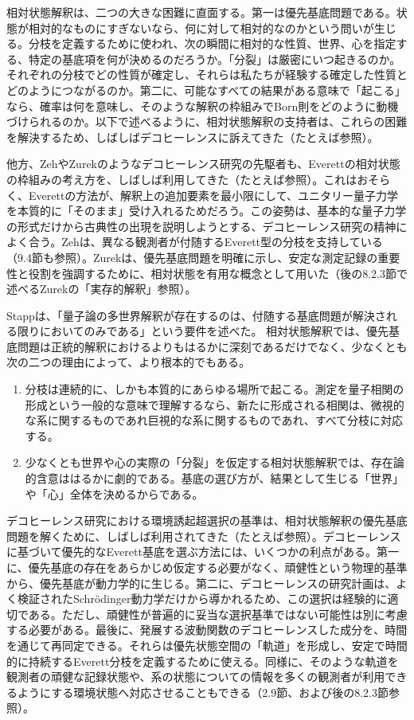 相対状態解釈は、二つの大きな困難に直面する。第一は優先基底問題である。状態が相対的なものにすぎないなら、何に対して相対的なのかという問いが生じる。分枝を定義するために使われ、次の瞬間に相対的な性質、世界、心を指定する、特定の基底項を何が決めるのだろうか。「分裂」は厳密にいつ起きるのか。それぞれの分枝でどの性質が確定し、それらは私たちが経験する確定した性質とどのようにつながるのか。第二に、可能なすべての結果がある意味で「起こる」なら、確率は何を意味し、そのような解釈の枠組みでBorn則をどのように動機づけられるのか。以下で述べるように、相対状態解釈の支持者は、これらの困難を解決するため、しばしばデコヒーレンスに訴えてきた（たとえば\cite{ref398,ref400,ref401,ref402,ref403,ref404,ref405,ref406,ref407}参照）。

他方、ZehやZurekのようなデコヒーレンス研究の先駆者も、Everettの相対状態の枠組みの考え方を、しばしば利用してきた（たとえば\cite{ref004,ref005,ref104,ref408}参照）。これはおそらく、Everettの方法が、解釈上の追加要素を最小限にして、ユニタリー量子力学を本質的に「そのまま」受け入れるためだろう。この姿勢は、基本的な量子力学の形式だけから古典性の出現を説明しようとする、デコヒーレンス研究の精神によく合う。Zehは、異なる観測者が付随するEverett型の分枝を支持している\cite{ref408}（9.4節も参照）。Zurekは、優先基底問題を明確に示し\cite{ref008}、安定な測定記録の重要性と役割を強調する\cite{ref084,ref104}ために、相対状態を有用な概念として用いた（後の8.2.3節で述べるZurekの「実存的解釈」参照）。

Stapp\cite[1043頁]{ref409}は、「量子論の多世界解釈が存在するのは、付随する基底問題が解決される限りにおいてのみである」という要件を述べた。
\hypertarget{srcpage:338}{}\label{srcpage:338}
相対状態解釈では、優先基底問題は正統的解釈におけるよりもはるかに深刻であるだけでなく、少なくとも次の二つの理由によって、より根本的でもある。
\begin{enumerate}
\item 分枝は連続的に、しかも本質的にあらゆる場所で起こる。測定を量子相関の形成という一般的な意味で理解するなら、新たに形成される相関は、微視的な系に関するものであれ巨視的な系に関するものであれ、すべて分枝に対応する。
\item 少なくとも世界や心の実際の「分裂」を仮定する相対状態解釈では、存在論的含意ははるかに劇的である。基底の選び方が、結果として生じる「世界」や「心」全体を決めるからである。
\end{enumerate}
デコヒーレンス研究における環境誘起超選択の基準は、相対状態解釈の優先基底問題を解くために、しばしば利用されてきた（たとえば\cite{ref104,ref406,ref407,ref410}参照）。デコヒーレンスに基づいて優先的なEverett基底を選ぶ方法には、いくつかの利点がある。第一に、優先基底の存在をあらかじめ仮定する必要がなく、頑健性という物理的基準から、優先基底が動力学的に生じる。第二に、デコヒーレンスの研究計画は、よく検証されたSchrödinger動力学だけから導かれるため、この選択は経験的に適切である。ただし、頑健性が普遍的に妥当な選択基準ではない可能性は別に考慮する必要がある。最後に、発展する波動関数のデコヒーレンスした成分を、時間を通じて再同定できる。それらは優先状態空間の「軌道」を形成し、安定で時間的に持続するEverett分枝を定義するために使える。同様に、そのような軌道を観測者の頑健な記録状態や、系の状態についての情報を多くの観測者が利用できるようにする環境状態へ対応させることもできる（2.9節、および後の8.2.3節参照）。

